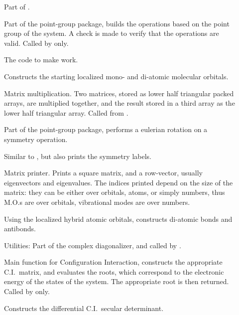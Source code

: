 \begin{description}
\item[] Part of .

\item[] Part of the point-group package,  builds the 
 operations based on the point group of the system.  A check is made to verify
 that the operations are valid. Called by  only.

\item[] The code to make  work.

\item[] Constructs the starting localized mono- and
di-atomic molecular orbitals.

\item[] Matrix multiplication. Two matrices, stored as lower half
triangular packed arrays, are multiplied together, and the result stored in a
third array as the lower half triangular array. Called from .

\item[] Part of the point-group package,   performs a 
eulerian rotation on a symmetry operation.

\item[] Similar to , but also prints the
symmetry labels.

\item[] Matrix printer. Prints a square matrix, and a 
row-vector, usually eigenvectors and eigenvalues. The indices  printed depend
on the size of the matrix: they can be either  over orbitals, atoms, or simply
numbers, thus M.O.s are over  orbitals, vibrational modes are over numbers.

\item[] Using the localized hybrid atomic orbitals, 
constructs di-atomic bonds and antibonds.

\item[] Utilities: Part of the complex diagonalizer, and
called by  .

\item[] Main function for Configuration Interaction,
 constructs the appropriate C.I.\ matrix, and evaluates the roots,
which correspond to the electronic energy of the states of the system. The
appropriate root is then returned. Called by   only.

\item[] Constructs the differential C.I.\ secular determinant.


\end{description}

